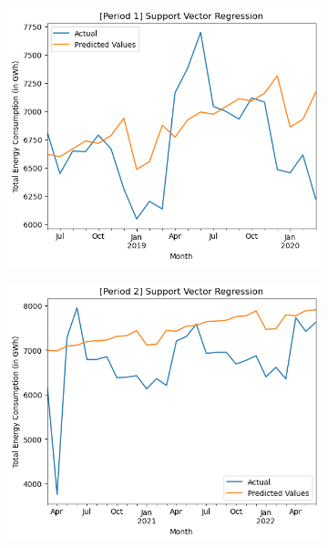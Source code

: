 \documentclass[runningheads]{llncs}
\begin{document}
\begin{center}
    \begin{figure}[h]
    \begin{subfigure}[h]{0.6\textwidth}
         \centering
         \hspace*{-1.3in}
         \includegraphics[width=\textwidth]{results/svr/p1.png}
         \caption{}
         \label{fig:resultSVR-p1}
    \end{subfigure}
    \begin{subfigure}[h]{0.6\textwidth}
         \centering
         \hspace*{-1.3in}
         \includegraphics[width=\textwidth]{results/svr/p2.png}

\end{subfigure}
\end{figure}
\end{center}
\end{document}
